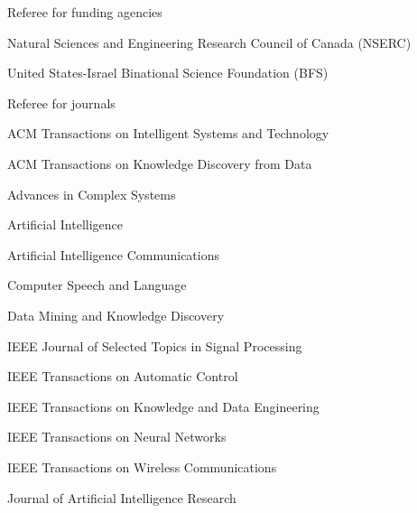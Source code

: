 \documentclass[10pt,twoside,letterpaper]{article}
\newcommand{\negitemspace}{\vspace{1mm}}
\begin{document}
\begin{compactitem}
\begin{compactitem}
\end{compactitem} \negitemspace

\item{Referee for funding agencies} \negitemspace

\begin{compactitem}

\item{Natural Sciences and Engineering Research Council of Canada (NSERC)}

\item{United States-Israel Binational Science Foundation (BFS)}

\end{compactitem}

\item{Referee for journals} \negitemspace

\begin{compactitem}

\item{ACM Transactions on Intelligent Systems and Technology}

\item{ACM Transactions on Knowledge Discovery from Data}

\item{Advances in Complex Systems}

\item{Artificial Intelligence}

\item{Artificial Intelligence Communications}

\item{Computer Speech and Language}

\item{Data Mining and Knowledge Discovery}

\item{IEEE Journal of Selected Topics in Signal Processing}

\item{IEEE Transactions on Automatic Control}

\item{IEEE Transactions on Knowledge and Data Engineering}

\item{IEEE Transactions on Neural Networks}

\item{IEEE Transactions on Wireless Communications}

\item{Journal of Artificial Intelligence Research}


\end{compactitem}
\end{compactitem}
\end{document}
